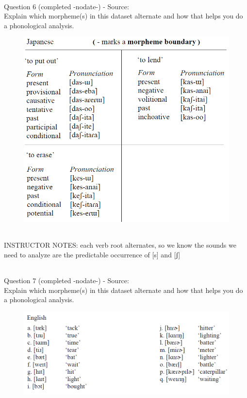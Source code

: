 \documentclass[12pt]{article}
\begin{document}
~\\

{\large Question 6} (completed -nodate-) - Source: \\

Explain which morpheme(s) in this dataset alternate and how that helps you do a phonological analysis.\\

\begin{figure}[H]
\includegraphics{../images/japanese_verbs.png}
\end{figure}

~\\
INSTRUCTOR NOTES: each verb root alternates, so we know the sounds we need to analyze are the predictable occurrence of [s] and [ʃ]


~\\

{\large Question 7} (completed -nodate-) - Source: \\

Explain which morpheme(s) in this dataset alternate and how that helps you do a phonological analysis.\\

\begin{figure}[H]
\includegraphics{../images/english_t_flap.png}
\end{figure}
\end{document}
